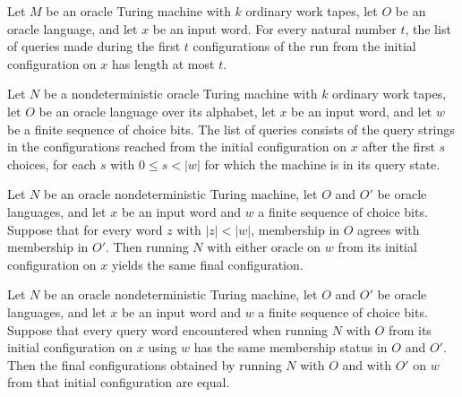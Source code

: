 \begin{theorem}
\label{Turing.OracleTM.queriesWithin_length_le}
\leanok
{}
Let $M$ be an oracle Turing machine with $k$ ordinary work tapes, let $O$ be an oracle
language, and let $x$ be an input word. For every natural number $t$, the list of
queries made during the first $t$ configurations of the run from the initial
configuration on $x$ has length at most $t$.
\end{theorem}

\begin{definition}
\label{Turing.OracleNDTM.queriesAlong}
\leanok
{}
Let $N$ be a nondeterministic oracle Turing machine with $k$ ordinary work tapes, let
$O$ be an oracle language over its alphabet, let $x$ be an input word, and let $w$ be a
finite sequence of choice bits. The list of queries consists of the query strings in the
configurations reached from the initial configuration on $x$ after the first $s$
choices, for each $s$ with $0\le s<|w|$ for which the machine is in its query state.
\end{definition}

\begin{theorem}
\label{Turing.OracleNDTM.runWith_eq_of_agree_length_lt}
\leanok
{}
Let $N$ be an oracle nondeterministic Turing machine, let $O$ and $O'$ be oracle
languages, and let $x$ be an input word and $w$ a finite sequence of choice bits.
Suppose that for every word $z$ with $|z|<|w|$, membership in $O$ agrees with membership
in $O'$. Then running $N$ with either oracle on $w$ from its initial configuration on
$x$ yields the same final configuration.
\end{theorem}

\begin{theorem}
\label{Turing.OracleNDTM.runWith_eq_of_agree_queriesAlong}
\leanok
{}
Let $N$ be an oracle nondeterministic Turing machine, let $O$ and $O'$ be oracle
languages, and let $x$ be an input word and $w$ a finite sequence of choice bits.
Suppose that every query word encountered when running $N$ with $O$ from its initial
configuration on $x$ using $w$ has the same membership status in $O$ and $O'$. Then the
final configurations obtained by running $N$ with $O$ and with $O'$ on $w$ from that
initial configuration are equal.
\end{theorem}

